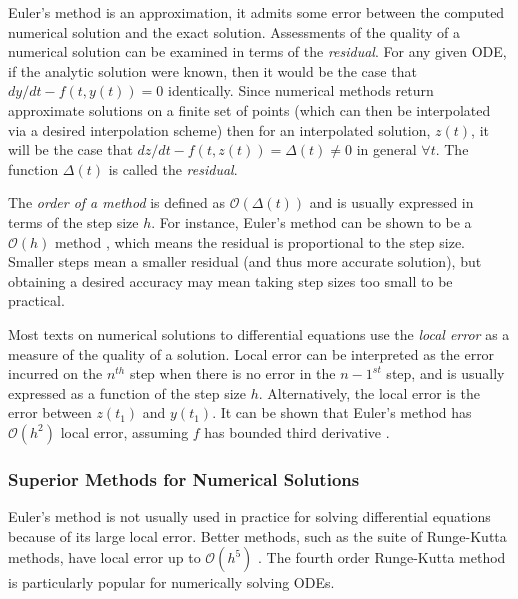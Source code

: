 Euler's method is an approximation, it admits some error between the computed numerical solution and the exact solution.  Assessments of the quality of a numerical solution can be examined in terms of the \textit{residual}.  For any given ODE, if the analytic solution were known, then it would be the case that $ dy/dt - f(t,y(t))= 0 $ identically.  Since numerical methods return approximate solutions on a finite set of points (which can then be interpolated via a desired interpolation scheme) then for an interpolated solution, $ z(t) $, it will be the case that $ dz/dt - f(t,z(t)) = \Delta (t) \neq 0$ in general $ \forall t $.  The function $ \Delta (t) $ is called the \textit{residual}.

The \textit{order of a method} is defined as $ \mathcal{O}(\Delta (t)) $ and is usually expressed in terms of the step size $ h $.  For instance, Euler's method can be shown to be a $ \mathcal{O}(h) $ method \cite{corless2013graduate}, which means the residual is proportional to the step size.  Smaller steps mean a smaller residual (and thus more accurate solution), but obtaining a desired accuracy may mean taking step sizes too small to be practical.

Most texts on numerical solutions to differential equations use the \textit{local error} as a measure of the quality of a solution.  Local error can be interpreted as the error incurred on the $ n^{th} $ step when there is no error in the $ n-1^{st} $ step, and is usually expressed as a function of the step size $ h $.  Alternatively, the local error is the error between $ z(t_1) $ and $ y(t_1) $. It can be shown that Euler's method has $ \mathcal{O}(h^2) $ local error, assuming $ f $ has bounded third derivative \cite{corless2013graduate}.

\subsubsection{Superior Methods for Numerical Solutions}

Euler's method is not usually used in practice for solving differential equations because of its large local error.  Better methods, such as the suite of Runge-Kutta methods,  have local error up to  $ \mathcal{O}(h^5) $ \cite{corless2013graduate}.  The fourth order Runge-Kutta method is particularly popular for numerically solving ODEs.

